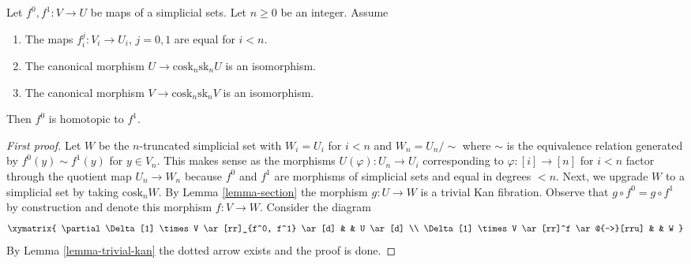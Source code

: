 \begin{lemma}
\label{lemma-homotopy}
Let $f^0, f^1 : V \to U$ be maps of a simplicial sets.
Let $n \geq 0$ be an integer.
Assume
\begin{enumerate}
\item The maps $f^j_i : V_i \to U_i$, $j = 0, 1$ are equal for $i < n$.
\item The canonical morphism $U \to \text{cosk}_n \text{sk}_n U$
is an isomorphism.
\item The canonical morphism $V \to \text{cosk}_n \text{sk}_n V$
is an isomorphism.
\end{enumerate}
Then $f^0$ is homotopic to $f^1$.
\end{lemma}

\begin{proof}[First proof]
Let $W$ be the $n$-truncated simplicial set with $W_i = U_i$ for
$i < n$ and $W_n = U_n / \sim$ where $\sim$ is the equivalence relation
generated by $f^0(y) \sim f^1(y)$ for $y \in V_n$. This makes sense
as the morphisms $U(\varphi) : U_n \to U_i$ corresponding to
$\varphi : [i] \to [n]$ for $i < n$ factor through the quotient map
$U_n \to W_n$ because $f^0$ and $f^1$ are morphisms of simplicial sets and
equal in degrees $< n$. Next, we upgrade $W$ to a simplicial set
by taking $\text{cosk}_n W$. By Lemma \ref{lemma-section}
the morphism $g : U \to W$ is a trivial Kan fibration. Observe
that $g \circ f^0 = g \circ f^1$ by construction and denote
this morphism $f : V \to W$. Consider the diagram
$$
\xymatrix{
\partial \Delta[1] \times V \ar[rr]_{f^0, f^1} \ar[d] & & U \ar[d] \\
\Delta[1] \times V \ar[rr]^f \ar@{-->}[rru] & & W
}
$$
By Lemma \ref{lemma-trivial-kan} the dotted arrow exists and the proof is done.
\end{proof}

